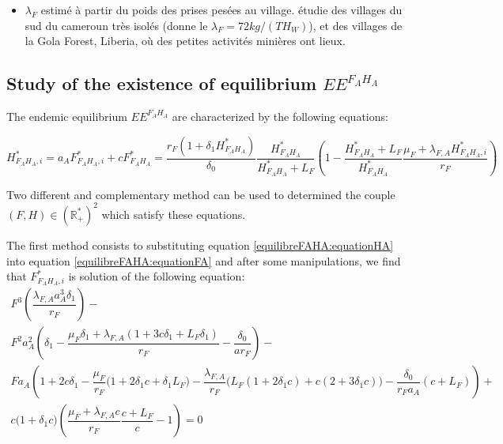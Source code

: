 \documentclass{article}
\newcommand{\lfa}{\lambda_{F, A}}
\newcommand{\lfw}{\lambda_{F}}
\begin{document}
\begin{itemize}
\item $\lfw$ estimé à partir du poids des prises pesées au village. \cite{avila_interpreting_2019} étudie des villages du sud du cameroun très isolés (donne le $\lfw = 72 kg/(TH_W)$), et \cite{jones_consequences_2020} des villages de la Gola Forest, Liberia, où des petites activités minières ont lieux.
 
\end{itemize}

\newpage



\newpage

\begin{appendices}
\section{Study of the existence of equilibrium $EE^{F_AH_A}$ \label{appendix:equilibreFAHA}}
The endemic equilibrium $EE^{F_AH_A}$ are characterized by the following equations:

\begin{subequations}
\begin{equation}
H^*_{F_AH_A, i} = a_A F^*_{F_AH_A, i} + c
\label{equilibreFAHA:equationHA}
\end{equation}
\begin{equation}
F^*_{F_AH_A} = \dfrac{r_F(1+\delta_1 H^*_{F_AH_A})}{\delta_0} \dfrac{H^*_{F_AH_A}}{H^*_{F_AH_A} + L_F} \left(1 - \dfrac{H^*_{F_AH_A} + L_F}{H^*_{F_AH_A}}\dfrac{\mu_F + \lfa H^*_{F_AH_A, i}}{r_F} \right)
\label{equilibreFAHA:equationFA}
\end{equation}
\end{subequations}

Two different and complementary method can be used to determined the couple $(F, H) \in (\mathbb{R}^*_+)^2$ which satisfy these equations.

The first method consists to substituting equation \eqref{equilibreFAHA:equationHA} into equation \eqref{equilibreFAHA:equationFA} and after some manipulations, we find that $F^*_{F_AH_A, i}$ is solution of the following equation:
\begin{multline}
F^3 \left(\dfrac{\lfa a_A^3 \delta_1}{r_F} \right) - \\
F^2 a_A^2 \left(\delta_1 - \dfrac{\mu_F \delta_1 + \lfa (1 + 3c\delta_1 + L_F \delta_1)}{r_F}- \dfrac{\delta_0}{a r_F} \right) - \\
F a_A  \left(1+ 2c\delta_1 - \dfrac{\mu_F}{r_F} \Big(1+2\delta_1 c + \delta_1 L_F\Big) - \dfrac{\lfa}{r_F} \Big(L_F(1+2\delta_1 c) + c(2 + 3\delta_1 c) \Big) - \dfrac{\delta_0}{r_F a_A} (c+L_F) \right) + \\ c\Big(1 + \delta_1 c \Big) \left(\dfrac{\mu_F + \lfa c}{r_F} \dfrac{c + L_F}{c} -1\right) = 0
\label{equilibreFAHA:cubique}
\end{multline}


\end{appendices}
\end{document}
